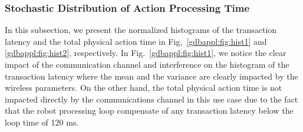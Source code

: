 \subsubsection{Stochastic Distribution of Action Processing Time}
In this subsection, we present the normalized histograms of the transaction latency and the total physical action time in Fig,~\ref{gdbappl:fig:hist1} and \ref{gdbappl:fig:hist2}, respectively. In Fig.~\ref{gdbappl:fig:hist1}, we notice the clear impact of the communication channel and interference on the histogram of the transaction latency where the mean and the variance are clearly impacted by the wireless parameters. On the other hand, the total physical action time is not impacted directly by the communications channel in this use case due to the fact that the robot processing loop compensate of any transaction latency below the loop time of 120 ms. 

